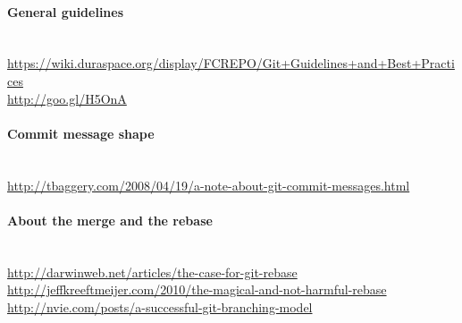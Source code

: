 \paragraph{General guidelines}~\\
\small{\url{https://wiki.duraspace.org/display/FCREPO/Git+Guidelines+and+Best+Practices}}\\
\small{\url{http://goo.gl/H5OnA}}\\

\paragraph{Commit message shape}~\\
\small{\url{http://tbaggery.com/2008/04/19/a-note-about-git-commit-messages.html}}\\

\paragraph{About the merge and the rebase}~\\
\small{\url{http://darwinweb.net/articles/the-case-for-git-rebase}}\\
\small{\url{http://jeffkreeftmeijer.com/2010/the-magical-and-not-harmful-rebase}}\\
\small{\url{http://nvie.com/posts/a-successful-git-branching-model}}\\
%
